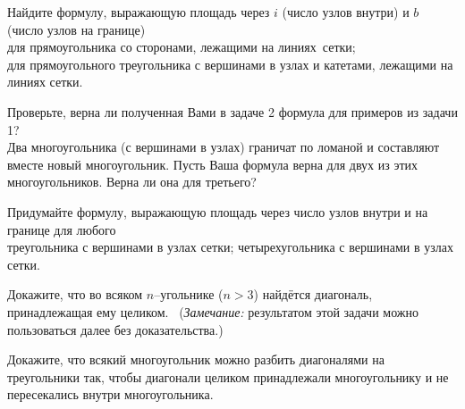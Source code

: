 \documentclass[a4paper,11pt]{article}
\begin{document}
\vspace*{1.5cm}

Найдите формулу, выражающую площадь через $i$ (число узлов внутри) и $b$ (число
узлов на границе)\\
для прямоугольника со сторонами, лежащими на линиях~сетки;\\
для прямоугольного треугольника с вершинами в узлах и катетами, лежащими на
линиях сетки.

 Проверьте, верна ли полученная Вами в задаче 2 формула для примеров из задачи 1?\\
 Два многоугольника (с вершинами в узлах) граничат по ломаной
и составляют
вместе новый многоугольник. Пусть Ваша формула верна для %
двух из этих многоугольников. Верна ли она для третьего? %

Придумайте формулу, выражающую площадь через число узлов внутри и на границе для любого\\
 треугольника с вершинами в узлах сетки;
 четырехугольника с вершинами в узлах сетки.







Докажите, что во всяком $n$--угольнике ($n>3$)
найдётся диагональ, принадлежащая ему целиком. \
({\sl Замечание:} результатом этой задачи можно пользоваться далее без
доказательства.)

 Докажите, что всякий многоугольник можно разбить диагоналями
на треугольники так, чтобы диагонали целиком принадлежали
многоугольнику и не пересекались внутри многоугольника.
\end{document}
